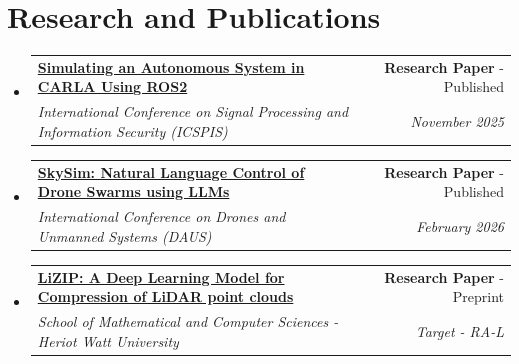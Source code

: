 \documentclass[a4paper,20pt]{article}
\makeatletter
\newcommand{\resumeSubheading}[4] {
	\vspace{-1pt}\item
	\begin{tabular*}{0.97\textwidth}{l@{\extracolsep{\fill}}r}
		\textbf{#1} & #2 \\
		\textit{#3} & \textit{#4} \\
	\end{tabular*}\vspace{-5pt}
}
\newcommand{\resumeSubHeadingListStart}{\begin{itemize}[leftmargin=*]}
\newcommand{\resumeSubHeadingListEnd}{\end{itemize}}
\makeatother
\begin{document}
\vspace{1pt}

\section{Research and Publications}
	\resumeSubHeadingListStart
        \resumeSubheading
		{\href{https://ieeexplore.ieee.org/document/11318365}{Simulating an Autonomous System in CARLA Using ROS2}}
		{\textbf{Research Paper} - Published} 
		{International Conference on Signal Processing and Information Security (ICSPIS)}{November 2025}
		\resumeSubheading
		{\href{https://sensorsportal.com/DOWNLOADS/DAUS_2026_Proceedings.pdf}{SkySim: Natural Language Control of Drone Swarms using LLMs}}
		{\textbf{Research Paper} - Published} 
		{International Conference on Drones and Unmanned Systems (DAUS)}{February 2026}
		\resumeSubheading
		{\href{https://arxiv.org/abs/2603.23162}{LiZIP: A Deep Learning Model for Compression of LiDAR point clouds}}
		{\textbf{Research Paper} - Preprint} 
		{School of Mathematical and Computer Sciences - Heriot Watt University}{Target - RA-L}
	\resumeSubHeadingListEnd

\vspace{1pt}
\end{document}
